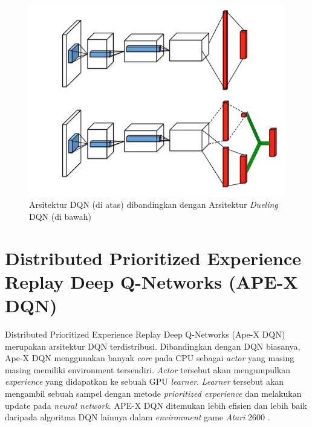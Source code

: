 \begin{figure}[H]
  \centering
    \includegraphics[scale=0.5]{gambar/dqn_vs_dueling_dqn_architecture.jpg}
    \caption{Arsitektur DQN (di atas) dibandingkan dengan Arsitektur \emph{Dueling} DQN (di bawah)}
    \label{fig:dqnVsDuelingDqnArchitecture}
\end{figure}

\section{Distributed Prioritized Experience Replay Deep Q-Networks (APE-X DQN)}

Distributed Prioritized Experience Replay Deep Q-Networks (Ape-X DQN) merupakan arsitektur DQN terdistribusi.
Dibandingkan dengan DQN biasanya, Ape-X DQN menggunakan banyak \emph{core} pada CPU sebagai \emph{actor} yang masing masing memiliki environment tersendiri.
\emph{Actor} tersebut akan mengumpulkan \emph{experience} yang didapatkan ke sebuah GPU \emph{learner}. 
\emph{Learner} tersebut akan mengambil sebuah sampel dengan metode \emph{prioritized experience} dan melakukan update pada \emph{neural network}. 
APE-X DQN ditemukan lebih efisien dan lebih baik daripada algoritma DQN lainnya dalam \emph{environment} game \emph{Atari} 2600 \citep{apexDQN}.

